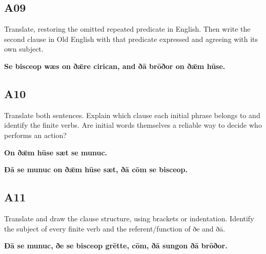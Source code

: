 \par\begin{minipage}{\linewidth}\raggedright
\subsection*{A09}

Translate, restoring the omitted repeated predicate in English. Then write the second clause in Old English with that predicate expressed and agreeing with its own subject.

\textbf{Se bisceop wæs on ðǣre cirican, and ðā brōðor on ðǣm hūse.}

\end{minipage}\par\addvspace{4pt}

\par\begin{minipage}{\linewidth}\raggedright
\subsection*{A10}

Translate both sentences. Explain which clause each initial phrase belongs to and identify the finite verbs. Are initial words themselves a reliable way to decide who performs an action?

\textbf{On ðǣm hūse sæt se munuc.}

\textbf{Ðā se munuc on ðǣm hūse sæt, ðā cōm se bisceop.}

\end{minipage}\par\addvspace{4pt}

\par\begin{minipage}{\linewidth}\raggedright
\subsection*{A11}

Translate and draw the clause structure, using brackets or indentation. Identify the subject of every finite verb and the referent/\allowbreak{}function of ðe and ðā.

\textbf{Ðā se munuc, ðe se bisceop grētte, cōm, ðā sungon ðā brōðor.}

\end{minipage}\par\addvspace{4pt}

